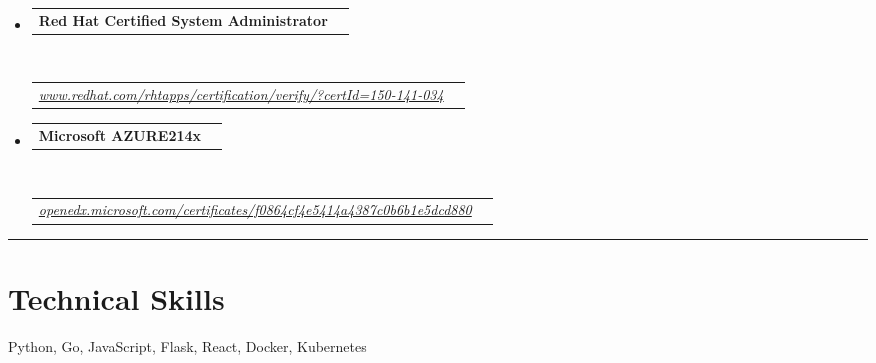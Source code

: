 \documentclass[10pt,a4paper,hidelinks]{article}
\makeatletter
\newenvironment{indentsection}[1]%
{\begin{list}{}%
	{\setlength{\leftmargin}{#1}}%
	\item[]%
}
{\end{list}}
\newcommand{\headerrow}[2]
{\begin{tabular*}{\linewidth}{l@{\extracolsep{\fill}}r}
	#1 &
	#2 \\
\end{tabular*}}
\makeatother
\begin{document}
\begin{itemize}
	\parskip=0.1em

	\item 
	\headerrow
		{\textbf{Red Hat Certified System Administrator}}
        {}
	\\
	\headerrow
	    {\emph{\href{https://www.redhat.com/rhtapps/certification/verify/?certId=150-141-034}{www.redhat.com/rhtapps/certification/verify/?certId=150-141-034}}}
		{\emph{}}
	
	\item 
	\headerrow
		{\textbf{Microsoft AZURE214x}}
		{}
	\\
	\headerrow
	    {\emph{\href{https://openedx.microsoft.com/certificates/f0864cf4e5414a4387c0b6b1e5dcd880}{openedx.microsoft.com/certificates/f0864cf4e5414a4387c0b6b1e5dcd880}}}
		{\emph{}}

\end{itemize}


{\color{IFLightBlue} \hrule}
\vspace{-0.3em}
{\color{IFMediumBlue}\section*{Technical Skills}}

\begin{indentsection}{\parindent}
\begin{description*}
    Python, Go, JavaScript, Flask, React, Docker, Kubernetes
\end{description*}
\end{indentsection}
\end{document}
